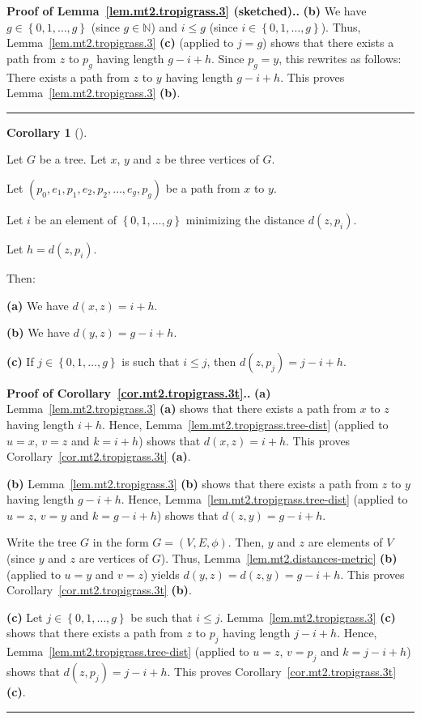 \documentclass[numbers=enddot,12pt,final,onecolumn,notitlepage]{scrartcl}%
\theoremstyle{definition}
\newtheorem{coro}[theo]{Corollary}
\newenvironment{corollary}[1][]
{\begin{coro}[#1]\begin{leftbar}}
{\end{leftbar}\end{coro}}
\newenvironment{proof}[1][Proof]{\noindent\textbf{#1.} }{\ \rule{0.5em}{0.5em}}
\newcommand{\NN}{\mathbb{N}}
\newcommand{\set}[1]{\left\{ #1 \right\}}
\newcommand{\tup}[1]{\left( #1 \right)}
\begin{document}
\begin{proof}[Proof of Lemma~\ref{lem.mt2.tropigrass.3} (sketched).]
\textbf{(b)} We have $g \in \set{0, 1, \ldots, g}$ (since
$g \in \NN$) and
$i \leq g$ (since $i \in \set{0, 1, \ldots, g}$).
Thus, Lemma~\ref{lem.mt2.tropigrass.3} \textbf{(c)}
(applied to $j = g$) shows that
there exists a path from $z$ to $p_g$
having length $g - i + h$.
Since $p_g = y$, this rewrites as follows:
There exists a path from $z$ to $y$ having
length $g - i + h$.
This proves Lemma~\ref{lem.mt2.tropigrass.3} \textbf{(b)}.
\end{proof}

\begin{corollary} \label{cor.mt2.tropigrass.3t}
Let $G$ be a tree.
Let $x$, $y$ and $z$ be three vertices of $G$.

Let $\tup{p_0, e_1, p_1, e_2, p_2, \ldots, e_g, p_g}$ be a path
from $x$ to $y$.

Let $i$ be an element of $\set{0, 1, \ldots, g}$ minimizing the
distance $d \tup{z, p_i}$.

Let $h = d \tup{z, p_i}$.

Then:

\textbf{(a)} We have $d \tup{x, z} = i + h$.

\textbf{(b)} We have $d \tup{y, z} = g - i + h$.

\textbf{(c)} If $j \in \set{0, 1, \ldots, g}$ is such that
$i \leq j$, then $d \tup{z, p_j} = j - i + h$.
\end{corollary}

\begin{proof}[Proof of Corollary~\ref{cor.mt2.tropigrass.3t}.]
\textbf{(a)} Lemma~\ref{lem.mt2.tropigrass.3} \textbf{(a)}
shows that there exists a path from $x$ to $z$ having
length $i + h$.
Hence, Lemma~\ref{lem.mt2.tropigrass.tree-dist}
(applied to $u = x$, $v = z$ and $k = i + h$) shows that
$d \tup{x, z} = i + h$.
This proves Corollary~\ref{cor.mt2.tropigrass.3t} \textbf{(a)}.

\textbf{(b)} Lemma~\ref{lem.mt2.tropigrass.3} \textbf{(b)}
shows that there exists a path from $z$ to $y$ having
length $g - i + h$.
Hence, Lemma~\ref{lem.mt2.tropigrass.tree-dist}
(applied to $u = z$, $v = y$ and $k = g - i + h$) shows that
$d \tup{z, y} = g - i + h$.

Write the tree $G$ in the form $G = \tup{V, E, \phi}$.
Then, $y$ and $z$ are elements of $V$ (since $y$ and $z$
are vertices of $G$).
Thus, Lemma~\ref{lem.mt2.distances-metric} \textbf{(b)}
(applied to $u = y$ and $v = z$) yields
$d \tup{y, z} = d \tup{z, y} = g - i + h$.
This proves Corollary~\ref{cor.mt2.tropigrass.3t} \textbf{(b)}.

\textbf{(c)} Let $j \in \set{0, 1, \ldots, g}$ be such that
$i \leq j$.
Lemma~\ref{lem.mt2.tropigrass.3} \textbf{(c)}
shows that there exists a path from $z$ to $p_j$ having
length $j - i + h$.
Hence, Lemma~\ref{lem.mt2.tropigrass.tree-dist}
(applied to $u = z$, $v = p_j$ and $k = j - i + h$) shows that
$d \tup{z, p_j} = j - i + h$.
This proves Corollary~\ref{cor.mt2.tropigrass.3t} \textbf{(c)}.
\end{proof}
\end{document}
